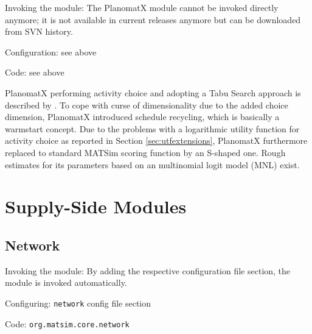 

{\color{lightgray}\tiny

\begin{compactitem}
\item Invoking the module: The PlanomatX module cannot be invoked directly anymore; it is not available in current releases anymore but can be downloaded from SVN history.
\item Configuration: see above
\item Code: see above
\end{compactitem}

PlanomatX performing activity choice and adopting a Tabu Search approach is described by \citet[][]{Feil_PhDThesis_2010}. To cope with curse of dimensionality due to the added choice dimension, PlanomatX introduced schedule recycling, which is basically a warmstart concept. Due to the problems with a logarithmic utility function for activity choice as reported in Section \ref{sec:utfextensions}, PlanomatX furthermore replaced to standard MATSim scoring function by an S-shaped one. Rough estimates for its parameters based on an multinomial logit model (MNL) exist.
}

\section{Supply-Side Modules}
\label{sec:supplysidemodules}

\subsection{Network}
\label{sec:network}
\begin{compactitem}
\item Invoking the module: By adding the respective configuration file section, the module is invoked automatically.
\item Configuring: \lstinline|network| config file section
\item Code: \lstinline|org.matsim.core.network|
\end{compactitem}

